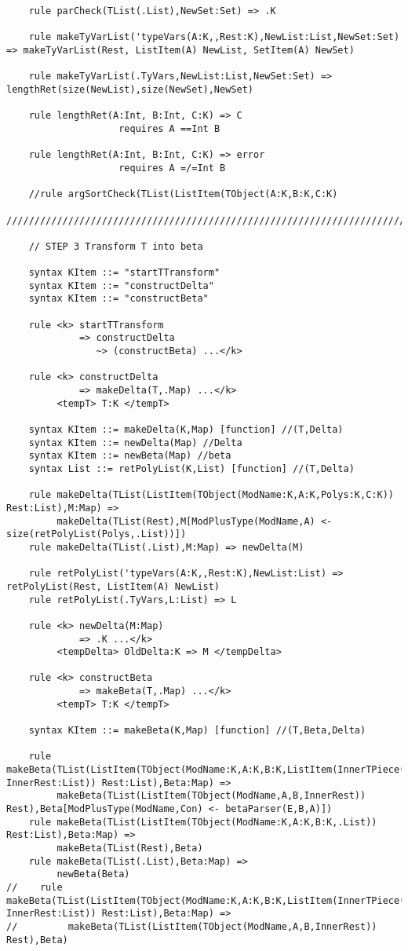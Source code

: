 \begin{lstlisting}
    rule parCheck(TList(.List),NewSet:Set) => .K

    rule makeTyVarList('typeVars(A:K,,Rest:K),NewList:List,NewSet:Set) => makeTyVarList(Rest, ListItem(A) NewList, SetItem(A) NewSet)

    rule makeTyVarList(.TyVars,NewList:List,NewSet:Set) => lengthRet(size(NewList),size(NewSet),NewSet)

    rule lengthRet(A:Int, B:Int, C:K) => C
                    requires A ==Int B

    rule lengthRet(A:Int, B:Int, C:K) => error
                    requires A =/=Int B
    
    //rule argSortCheck(TList(ListItem(TObject(A:K,B:K,C:K)

////////////////////////////////////////////////////////////////////////////////////////////////////////////////////////

    // STEP 3 Transform T into beta

    syntax KItem ::= "startTTransform"
    syntax KItem ::= "constructDelta"
    syntax KItem ::= "constructBeta"

    rule <k> startTTransform
             => constructDelta
                ~> (constructBeta) ...</k>

    rule <k> constructDelta
             => makeDelta(T,.Map) ...</k>
         <tempT> T:K </tempT>

    syntax KItem ::= makeDelta(K,Map) [function] //(T,Delta)
    syntax KItem ::= newDelta(Map) //Delta
    syntax KItem ::= newBeta(Map) //beta
    syntax List ::= retPolyList(K,List) [function] //(T,Delta)

    rule makeDelta(TList(ListItem(TObject(ModName:K,A:K,Polys:K,C:K)) Rest:List),M:Map) =>
         makeDelta(TList(Rest),M[ModPlusType(ModName,A) <- size(retPolyList(Polys,.List))])
    rule makeDelta(TList(.List),M:Map) => newDelta(M)

    rule retPolyList('typeVars(A:K,,Rest:K),NewList:List) => retPolyList(Rest, ListItem(A) NewList)
    rule retPolyList(.TyVars,L:List) => L

    rule <k> newDelta(M:Map)
             => .K ...</k>
         <tempDelta> OldDelta:K => M </tempDelta>

    rule <k> constructBeta
             => makeBeta(T,.Map) ...</k>
         <tempT> T:K </tempT>

    syntax KItem ::= makeBeta(K,Map) [function] //(T,Beta,Delta)

    rule makeBeta(TList(ListItem(TObject(ModName:K,A:K,B:K,ListItem(InnerTPiece(Con:K,H:K,D:K,E:K,F:K)) InnerRest:List)) Rest:List),Beta:Map) =>
         makeBeta(TList(ListItem(TObject(ModName,A,B,InnerRest)) Rest),Beta[ModPlusType(ModName,Con) <- betaParser(E,B,A)])
    rule makeBeta(TList(ListItem(TObject(ModName:K,A:K,B:K,.List)) Rest:List),Beta:Map) =>
         makeBeta(TList(Rest),Beta)
    rule makeBeta(TList(.List),Beta:Map) =>
         newBeta(Beta)
//    rule makeBeta(TList(ListItem(TObject(ModName:K,A:K,B:K,ListItem(InnerTPiece(C:K,H:K,D:K,E:K,F:K)) InnerRest:List)) Rest:List),Beta:Map) =>
//         makeBeta(TList(ListItem(TObject(ModName,A,B,InnerRest)) Rest),Beta)


\end{lstlisting}
